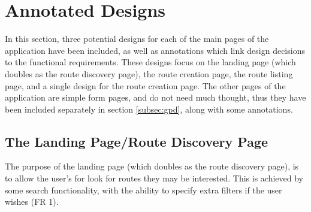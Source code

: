 \newpage 
\section{Annotated Designs}
In this section, three potential designs for each of the main pages of the application have been included, as well as annotations which link design decisions to the functional requirements. These designs focus on the landing page (which doubles as the route discovery page), the route creation page, the route listing page, and a single design for the route creation page. The other pages of the application are simple form pages, and do not need much thought, thus they have been included separately in section \ref{subsec:gpd}, along with some annotations. 

\subsection{The Landing Page/Route Discovery Page}
The purpose of the landing page (which doubles as the route discovery page), is to allow the user's for look for routes they may be interested. This is achieved by some search functionality, with the ability to specify extra filters if the user wishes (FR 1). 

